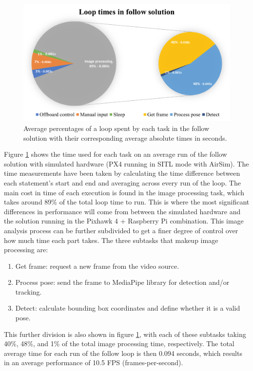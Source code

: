 \begin{figure}
  \centering
  \includegraphics[width=.8\textwidth, keepaspectratio]{img/sitl-performance.png}
  \caption{Average percentages of a loop spent by each task in the follow solution with their corresponding average absolute times in seconds.}
  \label{fig:perf-sitl-sim}
\end{figure}

Figure \ref{fig:perf-sitl-sim} shows the time used for each task on an average run of the follow solution with simulated hardware (PX4 running in SITL mode with AirSim).
The time measurements have been taken by calculating the time difference between each statement's start and end and averaging across every run of the loop.
The main cost in time of each execution is found in the image processing task, which takes around 89\% of the total loop time to run.
This is where the most significant differences in performance will come from between the simulated hardware and the solution running in the Pixhawk 4 + Raspberry Pi combination.
This image analysis process can be further subdivided to get a finer degree of control over how much time each part takes.
The three subtasks that makeup image processing are:
\begin{enumerate}
    \item Get frame: request a new frame from the video source.
    \item Process pose: send the frame to MediaPipe library for detection and/or tracking.
    \item Detect: calculate bounding box coordinates and define whether it is a valid pose.
\end{enumerate}

This further division is also shown in figure \ref{fig:perf-sitl-sim}, with each of these subtasks taking 40\%, 48\%, and 1\% of the total image processing time, respectively.
The total average time for each run of the follow loop is then 0.094 seconds, which results in an average performance of 10.5 FPS (frames-per-second).

